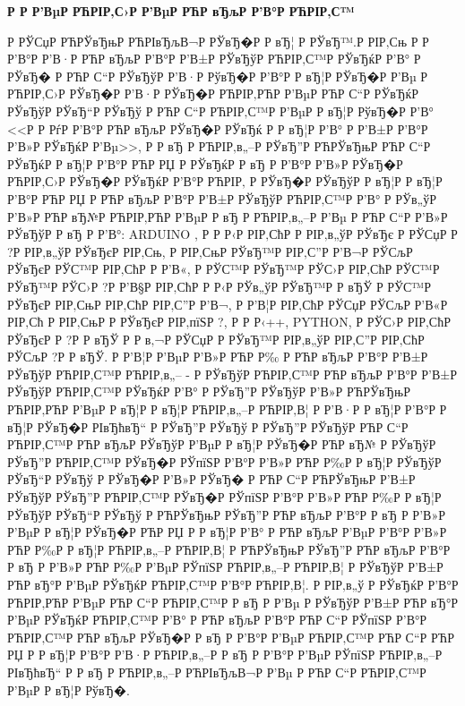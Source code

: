 \documentclass[a4paper,14pt]{extarticle}
\begin{document}
\thispagestyle{empty}

\centerline{\large \bfseries Р   Р  Р’ВµР РЋРІР‚С›Р  Р’ВµР РЋР вЂљР  Р’В°Р РЋРІР‚С™}
Р  РЎСџР РЋРЎвЂњР РЋРІвЂљВ¬Р  РЎвЂ�Р  Р вЂ¦ Р  РЎвЂ™.Р  РІР‚Сњ Р   Р  Р’В°Р  Р’В·Р РЋР вЂљР  Р’В°Р  Р’В±Р  РЎвЂўР РЋРІР‚С™Р  РЎвЂќР  Р’В° Р  РЎвЂ� Р РЋР С“Р  РЎвЂўР  Р’В·Р  РўвЂ�Р  Р’В°Р  Р вЂ¦Р  РЎвЂ�Р  Р’Вµ Р РЋРІР‚С›Р  РЎвЂ�Р  Р’В·Р  РЎвЂ�Р РЋРІР‚РЋР  Р’ВµР РЋР С“Р  РЎвЂќР  РЎвЂўР  РЎвЂ“Р  РЎвЂў Р РЋР С“Р РЋРІР‚С™Р  Р’ВµР  Р вЂ¦Р  РўвЂ�Р  Р’В° <<Р  Р РѓР  Р’В°Р РЋР вЂљР  РЎвЂ�Р  РЎвЂќ Р  Р вЂ¦Р  Р’В° Р  Р’В±Р  Р’В°Р  Р’В»Р  РЎвЂќР  Р’Вµ>>, Р  Р вЂ Р РЋРІР‚в„–Р  РЎвЂ”Р РЋРЎвЂњР РЋР С“Р  РЎвЂќР  Р вЂ¦Р  Р’В°Р РЋР РЏ Р  РЎвЂќР  Р вЂ Р  Р’В°Р  Р’В»Р  РЎвЂ�Р РЋРІР‚С›Р  РЎвЂ�Р  РЎвЂќР  Р’В°Р РЋРІР‚ Р  РЎвЂ�Р  РЎвЂўР  Р вЂ¦Р  Р вЂ¦Р  Р’В°Р РЋР РЏ Р РЋР вЂљР  Р’В°Р  Р’В±Р  РЎвЂўР РЋРІР‚С™Р  Р’В°
Р  РЎв„ўР  Р’В»Р РЋР вЂ№Р РЋРІР‚РЋР  Р’ВµР  Р вЂ Р РЋРІР‚в„–Р  Р’Вµ Р РЋР С“Р  Р’В»Р  РЎвЂўР  Р вЂ Р  Р’В°: ARDUINO	, Р  Р Р‹Р  РІР‚СћР   Р  РІР‚в„ўР  РЎвЂє Р  РЎСџР   Р  ?Р  РІР‚в„ўР  РЎвЂєР  РІР‚Сњ, Р  РІР‚СњР  РЎвЂ™Р  РІР‚С”Р  Р’В¬Р  РЎСљР  РЎвЂєР  РЎС™Р  РІР‚СћР   Р  Р’В«, Р  РЎС™Р  РЎвЂ™Р  РЎС›Р  РІР‚СћР  РЎС™Р  РЎвЂ™Р  РЎС›Р  ?Р  Р’В§Р  РІР‚СћР  Р Р‹Р  РЎв„ўР  РЎвЂ™Р  Р вЂЎ Р  РЎС™Р  РЎвЂєР  РІР‚СњР  РІР‚СћР  РІР‚С”Р  Р’В¬, Р  Р’В¦Р  РІР‚СћР  РЎСџР  РЎСљР  Р’В«Р  РІР‚Сћ Р  РІР‚СњР   Р  РЎвЂєР  РІР‚пїЅР  ?, Р  Р Р‹++, PYTHON, Р  РЎС›Р  РІР‚СћР  РЎвЂєР   Р  ?Р  Р вЂЎ Р  Р в‚¬Р  РЎСџР   Р  РЎвЂ™Р  РІР‚в„ўР  РІР‚С”Р  РІР‚СћР  РЎСљР  ?Р  Р вЂЎ.
Р  Р’В¦Р  Р’ВµР  Р’В»Р РЋР Р‰ Р РЋР вЂљР  Р’В°Р  Р’В±Р  РЎвЂўР РЋРІР‚С™Р РЋРІР‚в„– - Р  РЎвЂўР РЋРІР‚С™Р РЋР вЂљР  Р’В°Р  Р’В±Р  РЎвЂўР РЋРІР‚С™Р  РЎвЂќР  Р’В° Р  РЎвЂ”Р  РЎвЂўР  Р’В»Р РЋРЎвЂњР РЋРІР‚РЋР  Р’ВµР  Р вЂ¦Р  Р вЂ¦Р РЋРІР‚в„–Р РЋРІР‚В¦ Р  Р’В·Р  Р вЂ¦Р  Р’В°Р  Р вЂ¦Р  РЎвЂ�Р  РІвЂћвЂ“ Р  РЎвЂ”Р  РЎвЂў Р  РЎвЂ”Р  РЎвЂўР РЋР С“Р РЋРІР‚С™Р РЋР вЂљР  РЎвЂўР  Р’ВµР  Р вЂ¦Р  РЎвЂ�Р РЋР вЂ№ Р  РЎвЂўР  РЎвЂ”Р РЋРІР‚С™Р  РЎвЂ�Р  РЎпїЅР  Р’В°Р  Р’В»Р РЋР Р‰Р  Р вЂ¦Р  РЎвЂўР  РЎвЂ“Р  РЎвЂў Р  РЎвЂ�Р  Р’В»Р  РЎвЂ� Р РЋР С“Р РЋРЎвЂњР  Р’В±Р  РЎвЂўР  РЎвЂ”Р РЋРІР‚С™Р  РЎвЂ�Р  РЎпїЅР  Р’В°Р  Р’В»Р РЋР Р‰Р  Р вЂ¦Р  РЎвЂўР  РЎвЂ“Р  РЎвЂў Р РЋРЎвЂњР  РЎвЂ”Р РЋР вЂљР  Р’В°Р  Р вЂ Р  Р’В»Р  Р’ВµР  Р вЂ¦Р  РЎвЂ�Р РЋР РЏ Р  Р вЂ¦Р  Р’В° Р РЋР вЂљР  Р’ВµР  Р’В°Р  Р’В»Р РЋР Р‰Р  Р вЂ¦Р РЋРІР‚в„–Р РЋРІР‚В¦ Р РЋРЎвЂњР  РЎвЂ”Р РЋР вЂљР  Р’В°Р  Р вЂ Р  Р’В»Р РЋР Р‰Р  Р’ВµР  РЎпїЅР РЋРІР‚в„–Р РЋРІР‚В¦ Р  РЎвЂўР  Р’В±Р РЋР вЂ°Р  Р’ВµР  РЎвЂќР РЋРІР‚С™Р  Р’В°Р РЋРІР‚В¦. Р  РІР‚в„ў Р  РЎвЂќР  Р’В°Р РЋРІР‚РЋР  Р’ВµР РЋР С“Р РЋРІР‚С™Р  Р вЂ Р  Р’Вµ Р  РЎвЂўР  Р’В±Р РЋР вЂ°Р  Р’ВµР  РЎвЂќР РЋРІР‚С™Р  Р’В° Р РЋР вЂљР  Р’В°Р РЋР С“Р  РЎпїЅР  Р’В°Р РЋРІР‚С™Р РЋР вЂљР  РЎвЂ�Р  Р вЂ Р  Р’В°Р  Р’ВµР РЋРІР‚С™Р РЋР С“Р РЋР РЏ Р  Р вЂ¦Р  Р’В°Р  Р’В·Р РЋРІР‚в„–Р  Р вЂ Р  Р’В°Р  Р’ВµР  РЎпїЅР РЋРІР‚в„–Р  РІвЂћвЂ“ Р  Р вЂ Р РЋРІР‚в„–Р РЋРІвЂљВ¬Р  Р’Вµ Р РЋР С“Р РЋРІР‚С™Р  Р’ВµР  Р вЂ¦Р  РўвЂ�.
\end{document}
